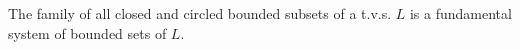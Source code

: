 The family of all closed and circled bounded subsets of a t.v.s. $L$ is a fundamental system of bounded sets of $L$.
